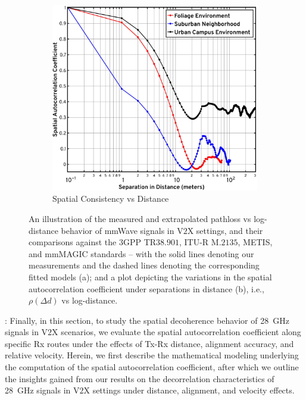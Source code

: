 \documentclass[12pt, draftcls, onecolumn]{IEEEtran}
\begin{document}
{\begin{figure} [t]
     \begin{subfigure}{0.5065\linewidth}
         \centering
         \includegraphics[width=1.0\linewidth]{figs/spatial_consistency_vs_distance.pdf}
         \caption{Spatial Consistency vs Distance}
         \label{F7b}
     \end{subfigure}
     \vspace{-8mm}
     \caption{An illustration of the measured and extrapolated pathloss vs log-distance behavior of mmWave signals in V$2$X settings, and their comparisons against the $3$GPP TR$38.901$, ITU-R M.$2135$, METIS, and mmMAGIC standards -- with the solid lines denoting our measurements and the dashed lines denoting the corresponding fitted models (a); and a plot depicting the variations in the spatial autocorrelation coefficient under separations in distance (b), i.e., $\rho(\Delta d)$ vs log-distance.}
     \label{F7}
\end{figure}

: Finally, in this section, to study the spatial decoherence behavior of \SI{28}{\giga\hertz} signals in V$2$X scenarios, we evaluate the spatial autocorrelation coefficient along specific Rx routes under the effects of Tx-Rx distance, alignment accuracy, and relative velocity. Herein, we first describe the mathematical modeling underlying the computation of the spatial autocorrelation coefficient, after which we outline the insights gained from our results on the decorrelation characteristics of \SI{28}{\giga\hertz} signals in V$2$X settings under distance, alignment, and velocity effects.

}
\end{document}
